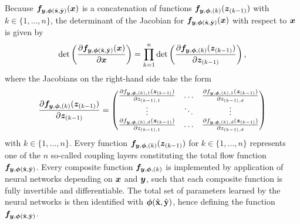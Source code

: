 \documentclass[a4paper,11pt]{report}
\begin{document}
Because $\bm{f}_{\bm{y},\bm{\phi}(\hat{\boldsymbol{\mathbf{x}}},\hat{\boldsymbol{\mathbf{y}}})}(\bm{x})$ is a concatenation of functions $\bm{f}_{\bm{y},\bm{\phi},(k)}(\bm{z}_{(k-1)})$ with $k \in \{1,\dots,n\}$, the determinant of the Jacobian  for $\bm{f}_{\bm{y},\bm{\phi}(\hat{\boldsymbol{\mathbf{x}}},\hat{\boldsymbol{\mathbf{y}}})}(\bm{x})$ with respect to $\bm{x}$ is given by \begin{equation}
\det\left(\frac{\partial \bm{f}_{\bm{y},\bm{\phi}(\hat{\boldsymbol{\mathbf{x}}},\hat{\boldsymbol{\mathbf{y}}})}(\bm{x})}{\partial \bm{x}}\right) = \prod_{k=1}^{n}\det\left(\frac{\partial \bm{f}_{\bm{y},\bm{\phi},(k)}(\bm{z}_{(k-1)})}{\partial \bm{z}_{(k-1)}}\right),
\end{equation} where the Jacobians on the right-hand side take the form \begin{equation}
\frac{\partial \bm{f}_{\bm{y},\bm{\phi},(k)}(\bm{z}_{(k-1)})}{\partial \bm{z}_{(k-1)}} = 
\begin{pmatrix}
\frac{\partial f_{\bm{y},\bm{\phi},(k),1}(\bm{z}_{(k-1)})}{\partial z_{(k-1),1}} & \dots & \frac{\partial f_{\bm{y},\bm{\phi},(k),1}(\bm{z}_{(k-1)})}{\partial z_{(k-1),d}} \\
\vdots & \ddots & \vdots \\
\frac{\partial f_{\bm{y},\bm{\phi},(k),d}(\bm{z}_{(k-1)})}{\partial z_{(k-1),1}} & \dots & \frac{\partial f_{\bm{y},\bm{\phi},(k),d}(\bm{z}_{(k-1)})}{\partial z_{(k-1),d}}
\end{pmatrix}
\end{equation} with $k \in \{1,\dots,n\}$. 
Every function $\bm{f}_{\bm{y},\bm{\phi},(k)}(\bm{z}_{(k-1)})$ for $k \in \{1,\dots,n\}$ represents one of the $n$ so-called coupling layers constituting the total flow function $\bm{f}_{\bm{y},\bm{\phi}(\hat{\boldsymbol{\mathbf{x}}},\hat{\boldsymbol{\mathbf{y}}})}$. Every composite function $\bm{f}_{\bm{y},\bm{\phi},(k)}$ is implemented by application of neural networks depending on $\bm{x}$ and $\bm{y}$, such that each composite function is fully invertible and differentiable. The total set of parameters learned by the neural networks is then identified with $\bm{\phi}(\hat{\boldsymbol{\mathbf{x}}},\hat{\boldsymbol{\mathbf{y}}})$, hence defining the function $\bm{f}_{\bm{y},\bm{\phi}(\hat{\boldsymbol{\mathbf{x}}},\hat{\boldsymbol{\mathbf{y}}})}$.
\end{document}
